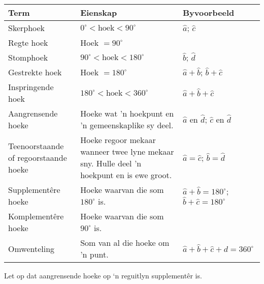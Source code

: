\begin{table}[H]
\begin{center}
\begin{tabular}{|p{3.5cm}|p{4cm}|p{4cm}|} \hline
\textbf{Term} & \textbf{Eienskap} & \textbf{Byvoorbeeld} \\ \hline
Skerphoek & $0^{\circ} < \mbox{hoek} < 90^{\circ}$ & $\hat{a}$; $\hat{c}$ \\ \hline
Regte hoek & Hoek $= 90^{\circ}$ &  \\ \hline
Stomphoek & $90^{\circ} < \mbox{hoek} < 180^{\circ}$ & $\hat{b}$; $\hat{d}$ \\ \hline
Gestrekte hoek & Hoek $= 180^{\circ}$ & $\hat{a} + \hat{b}$; $\hat{b} + \hat{c}$  \\ \hline
Inspringende hoek & $180^{\circ} < \mbox{hoek} < 360^{\circ}$ &  $\hat{a} + \hat{b} + \hat{c}$\\ \hline
Aangrensende hoeke & Hoeke wat 'n hoekpunt en 'n gemeenskaplike sy deel. & $\hat{a}$ en $\hat{d}$; $\hat{c}$ en $\hat{d}$ \\ \hline
Teenoorstaande of regoorstaande hoeke & Hoeke regoor mekaar wanneer twee lyne mekaar sny. Hulle deel 'n hoekpunt en is ewe groot. & $\hat{a}=\hat{c}$; $\hat{b}=\hat{d}$\\ \hline
Supplementêre hoeke & Hoeke waarvan die som $180^{\circ}$ is. & $\hat{a}+\hat{b}=180^{\circ}$; $\hat{b}+\hat{c}=180^{\circ}$ \\ \hline
Komplementêre hoeke  & Hoeke waarvan die som  $90^{\circ}$ is. & \\ \hline
Omwenteling & Som van al die hoeke om 'n punt. &  $\hat{a}+\hat{b}+\hat{c}+\hat{d}=360^{\circ}$ \\ \hline

\end{tabular}
\end{center}
\end{table}
 Let op dat aangrensende hoeke op ‘n reguitlyn supplementêr is.



